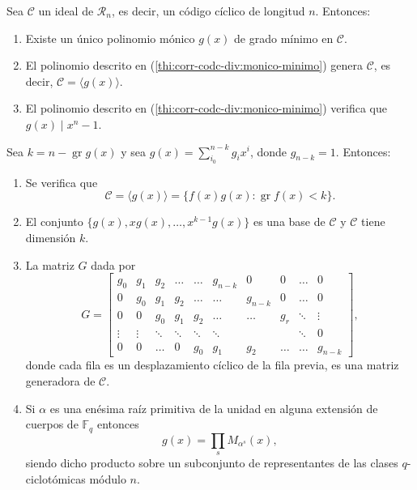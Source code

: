 \begin{theorem}
  \label{th:corr-cod-div}
  Sea \(\mathcal C\) un ideal de \(\mathcal R_n\), es decir, un código cíclico de longitud \(n\). Entonces:
  \begin{enumerate}
    \item Existe un único polinomio mónico \(g(x)\) de grado mínimo en \(\mathcal C\).\label{thi:corr-codc-div:monico-minimo}
    \item El polinomio descrito en (\ref{thi:corr-codc-div:monico-minimo}) genera \(\mathcal C\), es decir, \(\mathcal C = \langle g(x)\rangle\).
    \item El polinomio descrito en (\ref{thi:corr-codc-div:monico-minimo}) verifica que \(g(x) \mid x^n -1\).\label{thi:corr-codc-div:div-xn-1}
  \end{enumerate}
  Sea \(k = n - \operatorname{gr} g(x)\) y sea \(g(x) = \sum_{i_0}^{n-k}g_ix^{i}\), donde \(g_{n-k} = 1\). Entonces:
  \begin{enumerate}[resume]
    \item \label{thi:corr-codc-div:dim-ideal} Se verifica que \[
      \mathcal C = \langle g(x) \rangle = \{f(x)g(x) : \operatorname{gr} f(x) < k\}.
    \]
    \item El conjunto \(\{g(x), xg(x), \dots, x^{k-1}g(x)\}\) es una base de \(\mathcal C\) y \(\mathcal C\) tiene dimensión \(k\).
    \item \label{thi:corr-cod-div:mat-gen} La matriz \(G\) dada por \[
      G = \begin{bmatrix}
        g_0 & g_1 & g_2 & \dots & \dots & g_{n-k} & 0 & 0 & \dots & 0 \\
        0 & g_0 & g_1 & g_2 & \dots & \dots & g_{n-k} & 0 & \dots & 0 \\
        0 & 0 & g_0 & g_1 & g_2 & \dots & \dots & g_r & \ddots & \vdots \\
        \vdots & \vdots & \ddots & \ddots & \ddots & \ddots & & & \ddots & 0\\
        0 & 0 & \dots & 0 & g_0 & g_1 & g_2 & \dots & \dots & g_{n-k} 
      \end{bmatrix},
    \]
    donde cada fila es un desplazamiento cíclico de la fila previa, es una matriz generadora de \(\mathcal C\).
    \item \label{thi:pol-generador-prod-minimal} Si \(\alpha\) es una enésima raíz primitiva de la unidad en alguna extensión de cuerpos de \(\mathbb F_q\) entonces \[
      g(x) = \prod_s M_{\alpha^s}(x),
    \] siendo dicho producto sobre un subconjunto de representantes de las clases \(q\)-ciclotómicas módulo \(n\).
  \end{enumerate}
\end{theorem}

